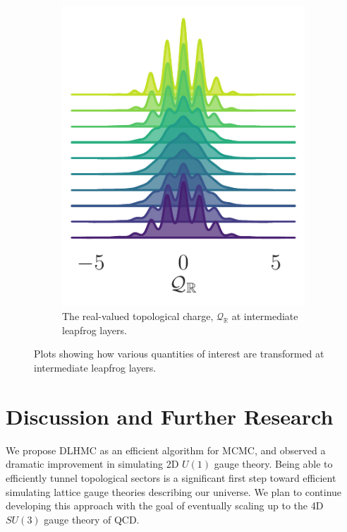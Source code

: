 \documentclass{article} %
\begin{document}
\begin{figure}[htpb]
\begin{subfigure}[h]{0.31\textwidth}
      \includegraphics[width=\textwidth]{figures/ridgeplots/sinQf_1544.pdf}
      \caption{\label{fig:sinQf}The real-valued topological charge, \(\mathcal{Q}_{\mathbb{R}}\) at intermediate
      leapfrog layers.}%
   \end{subfigure}
   \caption{Plots showing how various quantities of interest are transformed at intermediate leapfrog layers.}
\end{figure}
%
\section{Discussion and Further Research}
We propose DLHMC as an efficient algorithm for MCMC, and observed a dramatic improvement
in simulating 2D $U(1)$ gauge theory.
Being able to efficiently tunnel topological sectors is a significant first step toward efficient
simulating lattice gauge theories describing our universe.
%
We plan to continue developing this approach with the goal of eventually scaling up to the 4D \(SU(3)\) gauge theory of
QCD.\@
%
\end{document}
